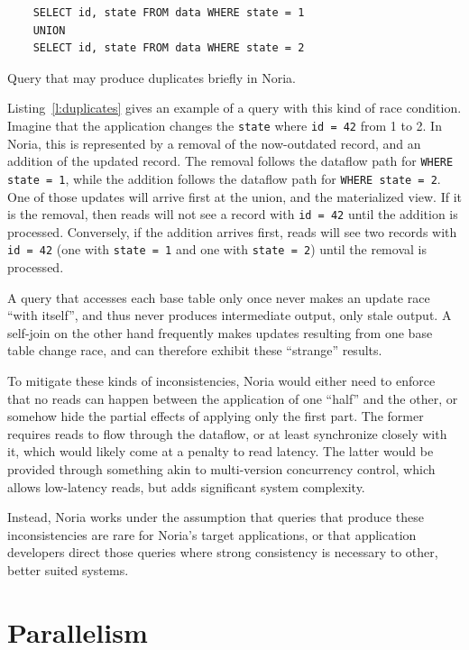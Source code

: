 \begin{listing}[h]
  \begin{verbatim}
    SELECT id, state FROM data WHERE state = 1
    UNION
    SELECT id, state FROM data WHERE state = 2
  \end{verbatim}
  \caption{Query that may produce duplicates briefly in Noria.}
  \label{l:duplicates}
\end{listing}

Listing~\vref{l:duplicates} gives an example of a query with this kind of race
condition. Imagine that the application changes the \texttt{state} where
\texttt{id = 42} from 1 to 2. In Noria, this is represented by a removal of the
now-outdated record, and an addition of the updated record. The removal follows
the dataflow path for \texttt{WHERE state = 1}, while the addition follows the
dataflow path for \texttt{WHERE state = 2}. One of those updates will arrive
first at the union, and the materialized view. If it is the removal, then reads
will not see a record with \texttt{id = 42} until the addition is processed.
Conversely, if the addition arrives first, reads will see two records with
\texttt{id = 42} (one with \texttt{state = 1} and one with \texttt{state = 2})
until the removal is processed.

A query that accesses each base table only once never makes an update race
``with itself'', and thus never produces intermediate output, only stale output.
A self-join on the other hand frequently makes updates resulting from one base
table change race, and can therefore exhibit these ``strange'' results.

To mitigate these kinds of inconsistencies, Noria would either need to enforce
that no reads can happen between the application of one ``half'' and the other,
or somehow hide the partial effects of applying only the first part. The former
requires reads to flow through the dataflow, or at least synchronize closely
with it, which would likely come at a penalty to read latency. The latter would
be provided through something akin to multi-version concurrency control, which
allows low-latency reads, but adds significant system complexity.

Instead, Noria works under the assumption that queries that produce these
inconsistencies are rare for Noria's target applications, or that application
developers direct those queries where strong consistency is necessary to other,
better suited systems.

\section{Parallelism}
\label{s:parallel}

